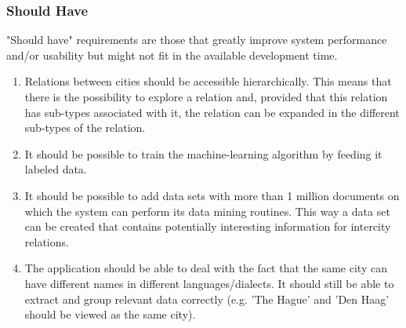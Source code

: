 \subsubsection {Should Have}
"Should have" requirements are those that greatly improve system performance and/or usability but might not fit in the available development time.

\begin{enumerate}
    \item Relations between cities should be accessible hierarchically. This means that there is the possibility to explore a relation and, provided that this relation has sub-types associated with it, the relation can be expanded in the different sub-types of the relation.
    \item It should be possible to train the machine-learning algorithm by feeding it labeled data.
    \item It should be possible to add data sets with more than 1 million documents on which the system can perform its data mining routines. This way a data set can be created that contains potentially interesting information for intercity relations.
    \item The application should be able to deal with the fact that the same city can have different names in different languages/dialects. It should still be able to extract and group relevant data correctly (e.g. 'The Hague' and 'Den Haag' should be viewed as the same city).
\end{enumerate}
\iffalse

